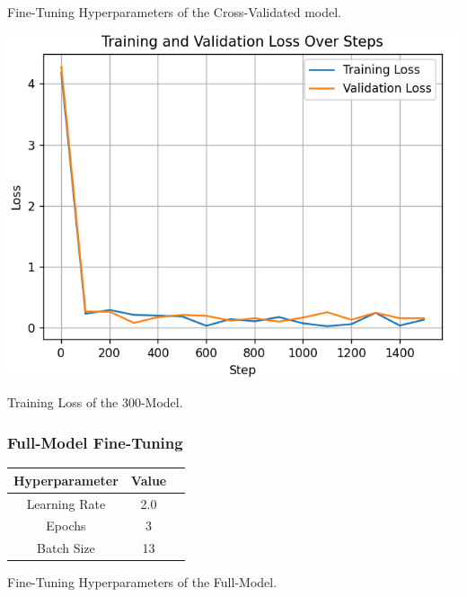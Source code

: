 \documentclass[10pt,twocolumn,letterpaper]{article}
\begin{document}
\begin{center}
    \small {Fine-Tuning Hyperparameters of the Cross-Validated model.} 
\end{center}

\begin{center}
\includegraphics*[scale=0.55]{img/training_loss_full.png} 
\end{center}

\begin{center}
    \small {Training Loss of the 300-Model.} 
\end{center}

\subsubsection*{Full-Model Fine-Tuning}

\begin{center}

    \begin{tabular}{ccc}
        \toprule
        Hyperparameter & Value \\
        \midrule
        Learning Rate & 2.0 \\
        Epochs & 3 \\
        Batch Size & 13 \\
        \bottomrule
    \end{tabular} 
\end{center} 

\begin{center}
    \small {Fine-Tuning Hyperparameters of the Full-Model.} 
\end{center}
\end{document}
